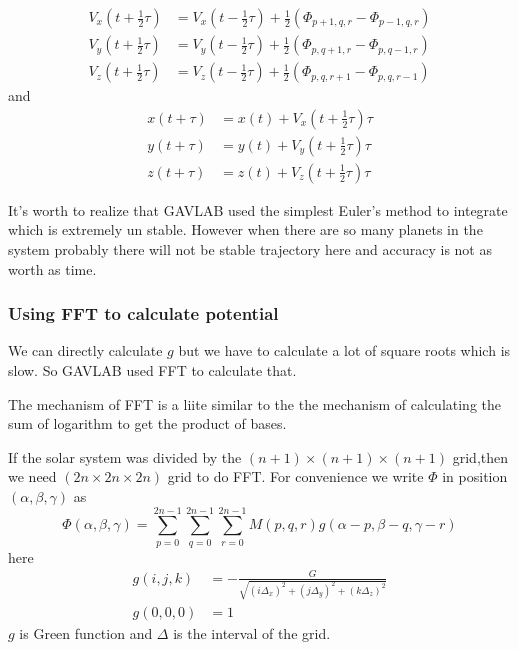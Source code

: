 \documentclass[12pt]{article}
\begin{document}
\begin{equation}
\begin{aligned}
V_{x}\left( t+\frac{1}{2}\tau  \right) &= V_{x}\left( t-\frac{1}{2}\tau  \right) + \frac{1}{2}\left(\Phi_{p+1,q,r}-\Phi_{p-1,q,r} \right) \\
V_{y}\left( t+\frac{1}{2}\tau  \right) &= V_{y}\left( t-\frac{1}{2}\tau  \right) + \frac{1}{2}\left(\Phi_{p,q+1,r}-\Phi_{p,q-1,r} \right) \\
V_{z}\left( t+\frac{1}{2}\tau  \right) &= V_{z}\left( t-\frac{1}{2}\tau  \right) + \frac{1}{2}\left(\Phi_{p,q,r+1}-\Phi_{p,q,r-1} \right) 
\end{aligned}
\end{equation}
and
\begin{equation}
\begin{aligned}
x\left(t+\tau \right) &= x\left(t \right) + V_{x}\left(t+ \frac{1}{2}\tau \right)\tau \\
y\left(t+\tau \right) &= y\left(t \right) + V_{y}\left(t+ \frac{1}{2}\tau \right)\tau \\
z\left(t+\tau \right) &= z\left(t \right) + V_{z}\left(t+ \frac{1}{2}\tau \right)\tau 
\end{aligned}
\end{equation}

It's worth to realize that GAVLAB used the simplest Euler's method to integrate which is extremely un stable.
However when there are so many planets in the system probably there will not be stable trajectory here and accuracy is
not as worth as time.

\subsubsection{Using FFT to calculate potential}
We can directly calculate $g$ but we have to calculate a lot of square roots which is slow.
So GAVLAB used FFT to calculate that.

The mechanism of FFT is a liite similar to the the mechanism of calculating the sum of logarithm to get the product
of bases.

If the solar system was divided by the $(n+1)\times (n+1) \times (n+1)$ grid,then we need $(2n \times 2n \times 2n) $ grid to do FFT.
For convenience we write $\Phi$ in position$(\alpha , \beta , \gamma)$ as
\begin{equation}
\Phi\left(\alpha , \beta , \gamma \right) = \sum_{p=0}^{2n-1} \sum_{q=0}^{2n-1} \sum_{r=0}^{2n-1} M(p,q,r) g\left(\alpha - p,\beta - q,\gamma - r \right)
\end{equation}
here
\begin{equation}
\begin{aligned}
g\left(i,j,k \right) &=-\frac{G}{\sqrt{(i \Delta_{x})^2 + (j \Delta_{y})^2 + (k \Delta_{z})^2}} \\
g\left(0,0,0 \right) &=1
\end{aligned}
\end{equation}
$g$ is Green function and $\Delta$ is the interval of the grid.
\end{document}
